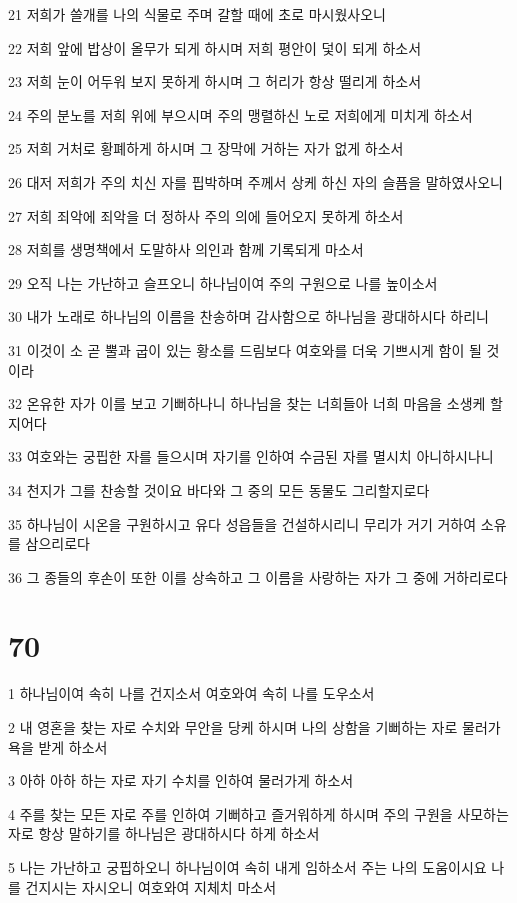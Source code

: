\par 21 저희가 쓸개를 나의 식물로 주며 갈할 때에 초로 마시웠사오니
\par 22 저희 앞에 밥상이 올무가 되게 하시며 저희 평안이 덫이 되게 하소서
\par 23 저희 눈이 어두워 보지 못하게 하시며 그 허리가 항상 떨리게 하소서
\par 24 주의 분노를 저희 위에 부으시며 주의 맹렬하신 노로 저희에게 미치게 하소서
\par 25 저희 거처로 황폐하게 하시며 그 장막에 거하는 자가 없게 하소서
\par 26 대저 저희가 주의 치신 자를 핍박하며 주께서 상케 하신 자의 슬픔을 말하였사오니
\par 27 저희 죄악에 죄악을 더 정하사 주의 의에 들어오지 못하게 하소서
\par 28 저희를 생명책에서 도말하사 의인과 함께 기록되게 마소서
\par 29 오직 나는 가난하고 슬프오니 하나님이여 주의 구원으로 나를 높이소서
\par 30 내가 노래로 하나님의 이름을 찬송하며 감사함으로 하나님을 광대하시다 하리니
\par 31 이것이 소 곧 뿔과 굽이 있는 황소를 드림보다 여호와를 더욱 기쁘시게 함이 될 것이라
\par 32 온유한 자가 이를 보고 기뻐하나니 하나님을 찾는 너희들아 너희 마음을 소생케 할지어다
\par 33 여호와는 궁핍한 자를 들으시며 자기를 인하여 수금된 자를 멸시치 아니하시나니
\par 34 천지가 그를 찬송할 것이요 바다와 그 중의 모든 동물도 그리할지로다
\par 35 하나님이 시온을 구원하시고 유다 성읍들을 건설하시리니 무리가 거기 거하여 소유를 삼으리로다
\par 36 그 종들의 후손이 또한 이를 상속하고 그 이름을 사랑하는 자가 그 중에 거하리로다

\chapter{70}

\par 1 하나님이여 속히 나를 건지소서 여호와여 속히 나를 도우소서
\par 2 내 영혼을 찾는 자로 수치와 무안을 당케 하시며 나의 상함을 기뻐하는 자로 물러가 욕을 받게 하소서
\par 3 아하 아하 하는 자로 자기 수치를 인하여 물러가게 하소서
\par 4 주를 찾는 모든 자로 주를 인하여 기뻐하고 즐거워하게 하시며 주의 구원을 사모하는 자로 항상 말하기를 하나님은 광대하시다 하게 하소서
\par 5 나는 가난하고 궁핍하오니 하나님이여 속히 내게 임하소서 주는 나의 도움이시요 나를 건지시는 자시오니 여호와여 지체치 마소서

